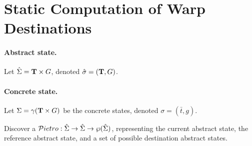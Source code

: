 




\section{Static Computation of Warp Destinations}

\paragraph{Abstract state.}
Let $\hat{\Sigma} = \mathbf{T} \times G$, denoted $\hat{\sigma} = (\mathbf{T},G)$.

\newcommand\ts{\bar{t}}

\paragraph{Concrete state.}
Let $\Sigma = \gamma(\mathbf{T} \times G)$ be the concrete states, denoted $\sigma = (\ts,g)$.

\newcommand\Pietrot{{\cal P}ietro}

Discover a $\Pietrot : \hat{\Sigma} \rightarrow \hat{\Sigma}
\rightarrow \wp({\hat{\Sigma}})$, representing the current abstract
state, the reference abstract state, and a set of possible destination
abstract states.


